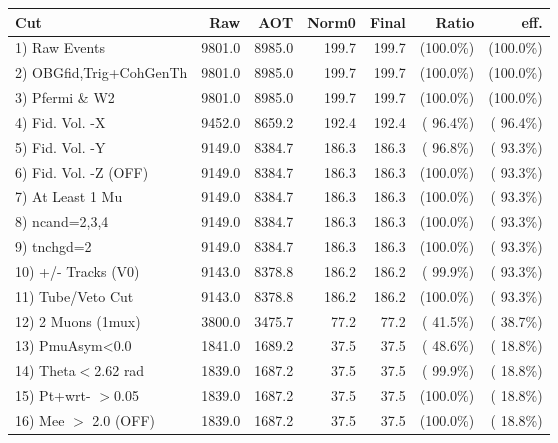  \begin{table}[h!]\centering
 \begin{tabular}{||l||r|r|r|r|r|r||}
 \hline
 \hline
 Cut & Raw & AOT & Norm0 & Final & Ratio & eff.       \\
 \hline
  1) Raw Events           &       9801.0 &       8985.0 &        199.7 &        199.7 & (100.0\%) & (100.0\%) \\
  2) OBGfid,Trig+CohGenTh &       9801.0 &       8985.0 &        199.7 &        199.7 & (100.0\%) & (100.0\%) \\
  3) Pfermi \& W2         &       9801.0 &       8985.0 &        199.7 &        199.7 & (100.0\%) & (100.0\%) \\
  4) Fid. Vol. -X         &       9452.0 &       8659.2 &        192.4 &        192.4 & ( 96.4\%) & ( 96.4\%) \\
  5) Fid. Vol. -Y         &       9149.0 &       8384.7 &        186.3 &        186.3 & ( 96.8\%) & ( 93.3\%) \\
  6) Fid. Vol. -Z (OFF)   &       9149.0 &       8384.7 &        186.3 &        186.3 & (100.0\%) & ( 93.3\%) \\
  7) At Least 1 Mu        &       9149.0 &       8384.7 &        186.3 &        186.3 & (100.0\%) & ( 93.3\%) \\
  8) ncand=2,3,4          &       9149.0 &       8384.7 &        186.3 &        186.3 & (100.0\%) & ( 93.3\%) \\
  9) tnchgd=2             &       9149.0 &       8384.7 &        186.3 &        186.3 & (100.0\%) & ( 93.3\%) \\
 10) +/- Tracks (V0)      &       9143.0 &       8378.8 &        186.2 &        186.2 & ( 99.9\%) & ( 93.3\%) \\
 11) Tube/Veto Cut        &       9143.0 &       8378.8 &        186.2 &        186.2 & (100.0\%) & ( 93.3\%) \\
 12) 2 Muons (1mux)       &       3800.0 &       3475.7 &         77.2 &         77.2 & ( 41.5\%) & ( 38.7\%) \\
 13) PmuAsym<0.0          &       1841.0 &       1689.2 &         37.5 &         37.5 & ( 48.6\%) & ( 18.8\%) \\
 14) Theta$<$2.62 rad     &       1839.0 &       1687.2 &         37.5 &         37.5 & ( 99.9\%) & ( 18.8\%) \\
 15) Pt+wrt- $>$0.05      &       1839.0 &       1687.2 &         37.5 &         37.5 & (100.0\%) & ( 18.8\%) \\
 16) Mee $>$ 2.0  (OFF)   &       1839.0 &       1687.2 &         37.5 &         37.5 & (100.0\%) & ( 18.8\%) \\

\end{tabular}
\end{table}
